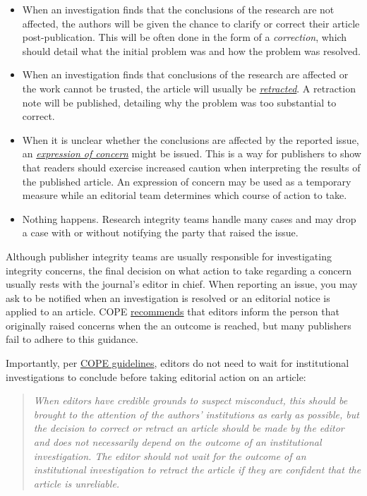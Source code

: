 \documentclass[letterpaper, 12pt]{article}
\begin{document}
\begin{itemize}
    \setlength\itemsep{-0.5em}
    \item When an investigation finds that the conclusions of the research are not affected, the authors will be given the chance to clarify or correct their article post-publication. This will be often done in the form of a \textit{correction}, which should detail what the initial problem was and how the problem was resolved.
    \item When an investigation finds that conclusions of the research are affected or the work cannot be trusted, the article will usually be \href{https://doi.org/10.24318/cope.2019.1.4}{\textit{retracted}}. A retraction note will be published, detailing why the problem was too substantial to correct.
    \item When it is unclear whether the conclusions are affected by the reported issue, an \href{https://doi.org/10.24318/mw2J3661}{\textit{expression of concern}} might be issued. This is a way for publishers to show that readers should exercise increased caution when interpreting the results of the published article. An expression of concern may be used as a temporary measure while an editorial team determines which course of action to take.
    \item Nothing happens. Research integrity teams handle many cases and may drop a case with or without notifying the party that raised the issue.
\end{itemize}

Although publisher integrity teams are usually responsible for investigating integrity concerns, the final decision on what action to take regarding a concern usually rests with the journal's editor in chief. When reporting an issue, you may ask to be notified when an investigation is resolved or an editorial notice is applied to an article. COPE \href{https://doi.org/10.24318/cope.2019.2.25}{recommends} that editors inform the person that originally raised concerns when the an outcome is reached, but many publishers fail to adhere to this guidance.

Importantly, per \href{https://publicationethics.org/guidance/guideline/retraction-guidelines}{COPE guidelines}, editors do not need to wait for institutional investigations to conclude before taking editorial action on an article:

\begin{quote}
    \textit{When editors have credible grounds to suspect misconduct, this should be brought to the attention of the authors’ institutions as early as possible, but the decision to correct or retract an article should be made by the editor and does not necessarily depend on the outcome of an institutional investigation. The editor should not wait for the outcome of an institutional investigation to retract the article if they are confident that the article is unreliable.}
\end{quote}
\end{document}
